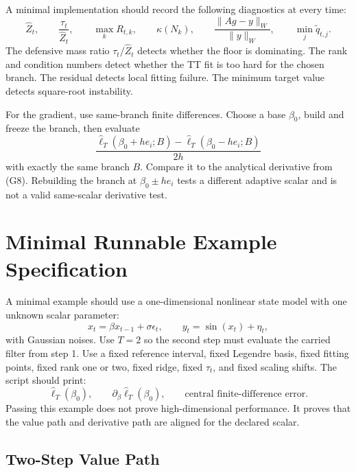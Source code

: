 \documentclass[11pt]{article}
\begin{document}
A minimal implementation should record the following diagnostics at every time:
\[
    \widehat Z_t,\qquad
    \frac{\tau_t}{\widehat Z_t},\qquad
    \max_k R_{t,k},\qquad
    \kappa(N_k),\qquad
    \frac{\|A g-y\|_W}{\|y\|_W},\qquad
    \min_j \widetilde q_{t,j}.
\]
The defensive mass ratio \(\tau_t/\widehat Z_t\) detects whether the floor is
dominating.  The rank and condition numbers detect whether the TT fit is too
hard for the chosen branch.  The residual detects local fitting failure.  The
minimum target value detects square-root instability.

For the gradient, use same-branch finite differences.  Choose a base
\(\beta_0\), build and freeze the branch, then evaluate
\[
    \frac{\widehat\ell_T(\beta_0+h e_i;B)
    -
    \widehat\ell_T(\beta_0-h e_i;B)}
    {2h}
\]
with exactly the same branch \(B\).  Compare it to the analytical derivative
from (G8).  Rebuilding the branch at \(\beta_0\pm h e_i\) tests a different
adaptive scalar and is not a valid same-scalar derivative test.

\section{Minimal Runnable Example Specification}

A minimal example should use a one-dimensional nonlinear state model with one
unknown scalar parameter:
\[
    x_t=\beta x_{t-1}+\sigma\epsilon_t,\qquad
    y_t=\sin(x_t)+\eta_t,
\]
with Gaussian noises.  Use \(T=2\) so the second step must evaluate the carried
filter from step 1.  Use a fixed reference interval, fixed Legendre basis,
fixed fitting points, fixed rank one or two, fixed ridge, fixed \(\tau_t\), and
fixed scaling shifts.  The script should print:
\[
    \widehat\ell_T(\beta_0),\qquad
    \partial_\beta\widehat\ell_T(\beta_0),\qquad
    \text{central finite-difference error}.
\]
Passing this example does not prove high-dimensional performance.  It proves
that the value path and derivative path are aligned for the declared scalar.

\subsection{Two-Step Value Path}
\end{document}
